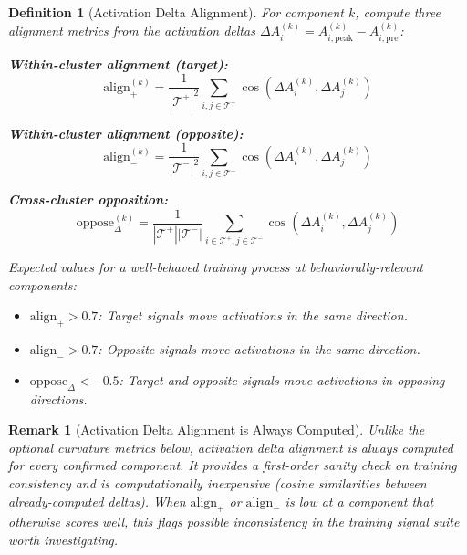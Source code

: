 \documentclass[11pt]{article}
\newtheorem{definition}{Definition}[section]
\newtheorem{remark}{Remark}[section]
\begin{document}
\begin{definition}[Activation Delta Alignment]
\label{def:delta-alignment}
For component $k$, compute three alignment metrics from the activation deltas $\Delta A^{(k)}_i = A^{(k)}_{i,\text{peak}} - A^{(k)}_{i,\text{pre}}$:

\textbf{Within-cluster alignment (target):}
\begin{equation}
\text{align}^{(k)}_+ = \frac{1}{|\mathcal{T}^+|^2}\sum_{i,j \in \mathcal{T}^+} \cos(\Delta A^{(k)}_i, \Delta A^{(k)}_j)
\end{equation}

\textbf{Within-cluster alignment (opposite):}
\begin{equation}
\text{align}^{(k)}_- = \frac{1}{|\mathcal{T}^-|^2}\sum_{i,j \in \mathcal{T}^-} \cos(\Delta A^{(k)}_i, \Delta A^{(k)}_j)
\end{equation}

\textbf{Cross-cluster opposition:}
\begin{equation}
\text{oppose}^{(k)}_{\Delta} = \frac{1}{|\mathcal{T}^+||\mathcal{T}^-|}\sum_{i \in \mathcal{T}^+, j \in \mathcal{T}^-} \cos(\Delta A^{(k)}_i, \Delta A^{(k)}_j)
\end{equation}

Expected values for a well-behaved training process at behaviorally-relevant components:
\begin{itemize}[nosep]
\item $\text{align}_+ > 0.7$: Target signals move activations in the same direction.
\item $\text{align}_- > 0.7$: Opposite signals move activations in the same direction.
\item $\text{oppose}_\Delta < -0.5$: Target and opposite signals move activations in opposing directions.
\end{itemize}
\end{definition}

\begin{remark}[Activation Delta Alignment is Always Computed]
\label{rem:activation-delta-alignment-always-computed}
Unlike the optional curvature metrics below, activation delta alignment is always computed for every confirmed component. It provides a first-order sanity check on training consistency and is computationally inexpensive (cosine similarities between already-computed deltas). When $\text{align}_+$ or $\text{align}_-$ is low at a component that otherwise scores well, this flags possible inconsistency in the training signal suite worth investigating.
\end{remark}
\end{document}
